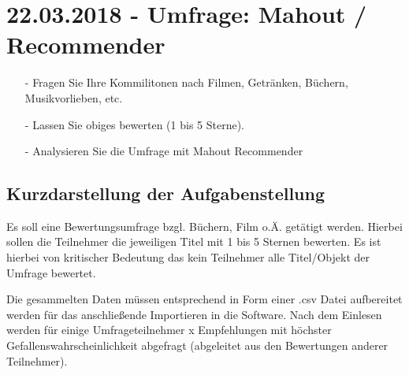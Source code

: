 \section{22.03.2018 - Umfrage: Mahout / Recommender}
\begin{itemize}
\item[-] Fragen Sie Ihre Kommilitonen nach Filmen, Getränken, Büchern, Musikvorlieben, etc.
\item[-] Lassen Sie obiges bewerten (1 bis 5 Sterne).
\item[-] Analysieren Sie die Umfrage mit Mahout Recommender
\end{itemize}

\subsection*{Kurzdarstellung der Aufgabenstellung}
Es soll eine Bewertungsumfrage bzgl. Büchern, Film o.Ä. getätigt werden. Hierbei sollen die Teilnehmer die jeweiligen Titel mit 1 bis 5 Sternen bewerten. Es ist hierbei von kritischer Bedeutung das kein Teilnehmer alle Titel/Objekt der Umfrage bewertet.

Die gesammelten Daten müssen entsprechend in Form einer .csv Datei aufbereitet werden für das anschließende Importieren in die Software. Nach dem Einlesen werden für einige Umfrageteilnehmer x Empfehlungen mit höchster Gefallenswahrscheinlichkeit abgefragt (abgeleitet aus den Bewertungen anderer Teilnehmer).

